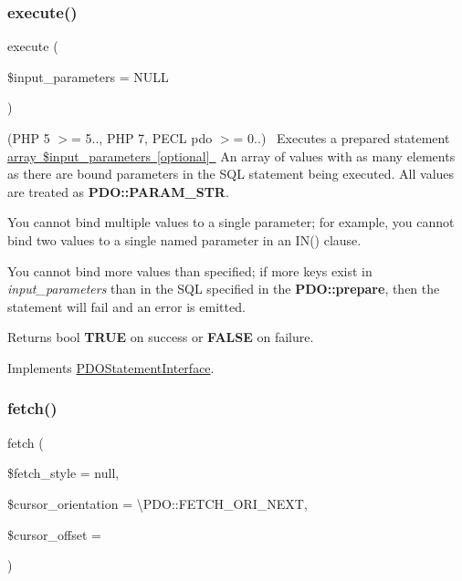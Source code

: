 \subsubsection{\texorpdfstring{execute()}{execute()}}
{\footnotesize\ttfamily execute (\begin{DoxyParamCaption}\item[{}]{\$input\+\_\+parameters = {\ttfamily NULL} }\end{DoxyParamCaption})}

(P\+HP 5 $>$= 5.., P\+HP 7, P\+E\+CL pdo $>$= 0..)~\newline
 Executes a prepared statement \mbox{\hyperlink{}{array \$input\+\_\+parameters \mbox{[}optional\mbox{]} }} An array of values with as many elements as there are bound parameters in the S\+QL statement being executed. All values are treated as {\bfseries P\+D\+O\+::\+P\+A\+R\+A\+M\+\_\+\+S\+TR}. 

You cannot bind multiple values to a single parameter; for example, you cannot bind two values to a single named parameter in an I\+N() clause. 

You cannot bind more values than specified; if more keys exist in {\itshape input\+\_\+parameters} than in the S\+QL specified in the {\bfseries P\+D\+O\+::prepare}, then the statement will fail and an error is emitted. 

\begin{DoxyReturn}{Returns}
bool {\bfseries T\+R\+UE} on success or {\bfseries F\+A\+L\+SE} on failure. 
\end{DoxyReturn}


Implements \mbox{\hyperlink{interface_pes_1_1_database_1_1_statement_1_1_p_d_o_statement_interface_a0e8db3191f62e77a6dac20beb5bd28e7}{P\+D\+O\+Statement\+Interface}}.

\mbox{\label{class_pes_1_1_database_1_1_statement_1_1_statement_a5b20a3b5483f33168970c1ff76758042}} 
\subsubsection{\texorpdfstring{fetch()}{fetch()}}
{\footnotesize\ttfamily fetch (\begin{DoxyParamCaption}\item[{}]{\$fetch\+\_\+style = {\ttfamily null},  }\item[{}]{\$cursor\+\_\+orientation = {\ttfamily \textbackslash{}PDO\+:\+:FETCH\+\_\+ORI\+\_\+NEXT},  }\item[{}]{\$cursor\+\_\+offset = {} }\end{DoxyParamCaption})}

